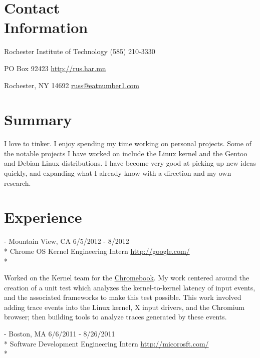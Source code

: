 \documentclass[a4paper,margin,line]{resume}
\newcommand{\rurl}[1]{\hfill {\footnotesize \url{#1}}}
\newcommand{\rdate}[1]{\hfill {\small #1}}
\renewcommand{\employer}[5]{\item[#1] - #2 \rdate{#3} \\* #4 \rurl{#5} \\*}
\begin{document}
\begin{resume}
\section{\mysidestyle Contact \\ Information} \vspace{2mm}
	\begin{asparablank}
		\item Rochester Institute of Technology \hfill (585) 210-3330
		\item PO Box 92423 \hfill \href{http://rus.har.mn/}{http://rus.har.mn}
		\item Rochester, NY 14692 \hfill \href{mailto:russ@eatnumber1.com}{russ@eatnumber1.com}
	\end{asparablank}


\section{\mysidestyle Summary}
	I love to tinker. I enjoy spending my time working on personal projects.
	Some of the notable projects I have worked on include the Linux kernel and
	the Gentoo and Debian Linux distributions.  I have become very good at
	picking up new ideas quickly, and expanding what I already know with a
	direction and my own research.

\section{\mysidestyle Experience}
	\begin{asparadesc}
		\employer{Google}{Mountain View, CA}{6/5/2012 - 8/2012}{Chrome OS Kernel Engineering Intern}{http://google.com/}

		\small
		Worked on the Kernel team for the \href{http://www.google.com/intl/en/chrome/devices/}{Chromebook}. My work centered around the creation of a unit test which analyzes the kernel-to-kernel latency of input events, and the associated frameworks to make this test possible. This work involved adding trace events into the Linux kernel, X input drivers, and the Chromium browser; then building tools to analyze traces generated by these events.
		\normalsize
		\\
		\employer{Microsoft}{Boston, MA}{6/6/2011 - 8/26/2011}{Software Development Engineering Intern}{http://micorosft.com/}


\end{asparadesc}
\end{resume}
\end{document}
